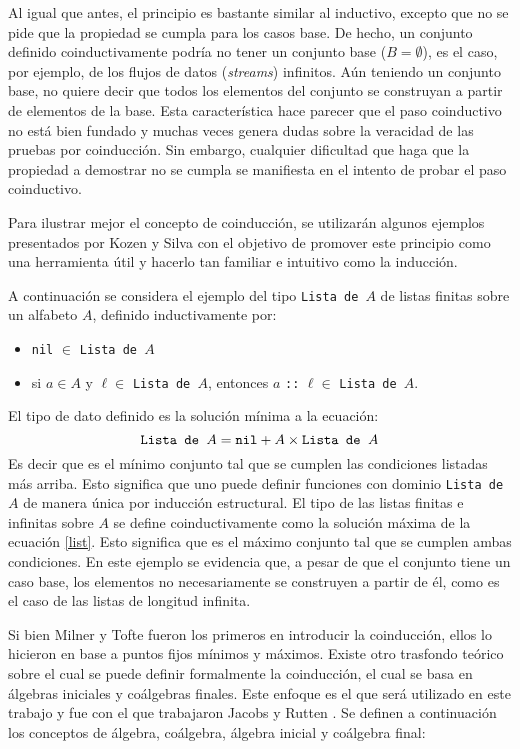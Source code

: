 Al igual que antes, el principio es bastante similar al inductivo, excepto que no se pide que la propiedad se cumpla para los casos base. De hecho, un conjunto definido coinductivamente podría no tener un conjunto base ($B = \emptyset$), es el caso, por ejemplo, de los flujos de datos (\textit{streams}) infinitos. Aún teniendo un conjunto base, no quiere decir que todos los elementos del conjunto se construyan a partir de elementos de la base. Esta característica hace parecer que el paso coinductivo no está bien fundado y muchas veces genera dudas sobre la veracidad de las pruebas por coinducción. Sin embargo, cualquier dificultad que haga que la propiedad a demostrar no se cumpla se manifiesta en el intento de probar el paso coinductivo.

Para ilustrar mejor el concepto de coinducción, se utilizarán algunos ejemplos presentados por Kozen y Silva \cite{kozen:2017} con el objetivo de promover este principio como una herramienta útil y hacerlo tan familiar e intuitivo como la inducción. 

A continuación se considera el ejemplo del tipo \texttt{Lista de $A$} de listas finitas sobre un alfabeto $A$, definido inductivamente por:
\begin{itemize}[label=$\blacktriangleright$]
	\item \texttt{nil} $\in$ \texttt{Lista de $A$}
	\item si $a \in A$ y $\ell \in$ \texttt{Lista de $A$}, entonces $a$ \texttt{::} $\ell \in$ \texttt{Lista de $A$}. 
\end{itemize}

El tipo de dato definido es la solución  mínima a la ecuación:
\begin{equation}\label{list}
\text{\tt Lista de $A$} = \text{\tt nil} + A \times \text{\tt Lista de $A$}
\end{equation}
Es decir que es el mínimo conjunto tal que se cumplen las condiciones listadas más arriba. Esto significa que uno puede definir funciones con dominio \texttt{Lista de $A$} de manera única por inducción estructural. El tipo de las listas finitas e infinitas sobre $A$ se define coinductivamente como la solución máxima de la ecuación \ref{list}. Esto significa que es el máximo conjunto tal que se cumplen ambas condiciones. En este ejemplo se evidencia que, a pesar de que el conjunto tiene un caso base, los elementos no necesariamente se construyen a partir de él, como es el caso de las listas de longitud infinita.

Si bien Milner y Tofte \cite{milner:1991} fueron los primeros en introducir la coinducción, ellos lo hicieron en base a puntos fijos mínimos y máximos. Existe otro  trasfondo teórico sobre el cual se puede definir formalmente la coinducción, el cual se basa en álgebras iniciales y coálgebras finales. Este enfoque es el que será utilizado en este trabajo y fue con el que trabajaron Jacobs y Rutten \cite{jacobs:2012}. Se definen a continuación los conceptos de álgebra, coálgebra, álgebra inicial y coálgebra final:

